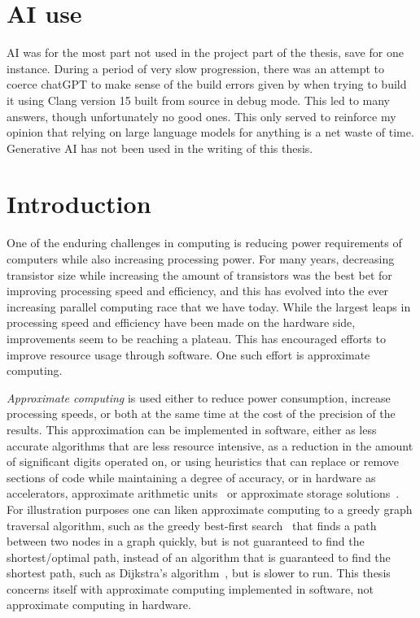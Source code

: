 \section*{AI use}
AI was for the most part not used in the project part of the thesis, save for one instance. During a period of very slow progression, there was an attempt to coerce chatGPT to make sense of the build errors given by \taffo{} when trying to build it using Clang version 15 built from source in debug mode. This led to many answers, though unfortunately no good ones. This only served to reinforce my opinion that relying on large language models for anything is a net waste of time. Generative AI has not been used in the writing of this thesis.


\section{Introduction}

One of the enduring challenges in computing is reducing power requirements of computers while also increasing processing power. For many years, decreasing transistor size while increasing the amount of transistors was the best bet for improving processing speed and efficiency, and this has evolved into the ever increasing parallel computing race that we have today. While the largest leaps in processing speed and efficiency have been made on the hardware side, improvements seem to be reaching a plateau. This has encouraged efforts to improve resource usage through software. One such effort is approximate computing. 

\emph{Approximate computing} is used either to reduce power consumption, increase processing speeds, or both at the same time at the cost of the precision of the results. This approximation can be implemented in software, either as less accurate algorithms that are less resource intensive, as a reduction in the amount of significant digits operated on, or using heuristics that can replace or remove sections of code while maintaining a degree of accuracy, or in hardware as accelerators\citep{moreau2015snnap}, approximate arithmetic units~\citep{han2013approximate} or approximate storage solutions~\citep{nguyen2020approximate}. For illustration purposes one can liken approximate computing to a greedy graph traversal algorithm, such as the greedy best-first search~\citep{coles2007marvin} that finds a path between two nodes in a graph quickly, but is not guaranteed to find the shortest/optimal path, instead of an algorithm that is guaranteed to find the shortest path, such as Dijkstra's algorithm~\citep{dijkstra1959note}, but is slower to run. This thesis concerns itself with approximate computing implemented in software, not approximate computing in hardware. 

